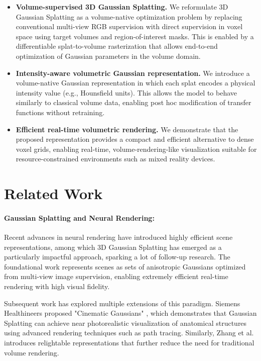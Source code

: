 \documentclass[runningheads]{llncs}
\begin{document}
\begin{itemize}

\item \textbf{Volume-supervised 3D Gaussian Splatting.}
We reformulate 3D Gaussian Splatting as a volume-native optimization problem by replacing conventional multi-view RGB supervision with direct supervision in voxel space using target volumes and region-of-interest masks. This is enabled by a differentiable splat-to-volume rasterization that allows end-to-end optimization of Gaussian parameters in the volume domain.

\item \textbf{Intensity-aware volumetric Gaussian representation.}
We introduce a volume-native Gaussian representation in which each splat encodes a physical intensity value (e.g., Hounsfield units). This allows the model to behave similarly to classical volume data, enabling post hoc modification of transfer functions without retraining.

\item \textbf{Efficient real-time volumetric rendering.}
We demonstrate that the proposed representation provides a compact and efficient alternative to dense voxel grids, enabling real-time, volume-rendering-like visualization suitable for resource-constrained environments such as mixed reality devices.

\end{itemize}


\section{Related Work}

\paragraph{Gaussian Splatting and Neural Rendering:}
Recent advances in neural rendering have introduced highly efficient scene representations, among which 3D Gaussian Splatting \cite{kerbl2023gaussiansplatting} has emerged as a particularly impactful approach, sparking a lot of follow-up research. The foundational work represents scenes as sets of anisotropic Gaussians optimized from multi-view image supervision, enabling extremely efficient real-time rendering with high visual fidelity.

Subsequent work has explored multiple extensions of this paradigm. Siemens Healthineers proposed "Cinematic Gaussians" \cite{cinematicgaussians2024}, which demonstrates that Gaussian Splatting can achieve near photorealistic visualization of anatomical structures using advanced rendering techniques such as path tracing. Similarly, Zhang et al. \cite{relightablegaussian2024} introduces relightable representations that further reduce the need for traditional volume rendering.
\end{document}
